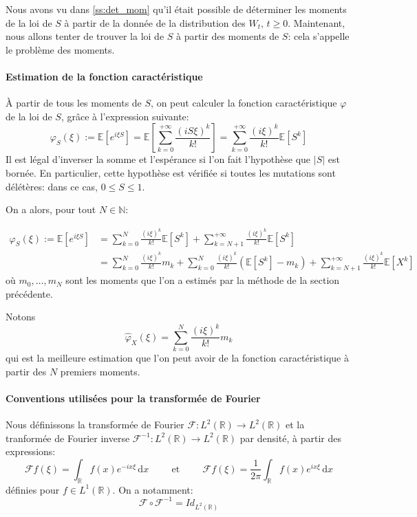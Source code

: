 \documentclass[12pt]{article}
\newcommand{\pth}[1]{\left(#1\right)}
\newcommand{\cro}[1]{\left[#1\right]}
\newcommand{\abs}[1]{\left|#1\right|}
\newcommand{\et}{\hspace{1cm}\text{et}\hspace{1cm}}
\newcommand{\vg}{,\,}
\newcommand{\Er}{\mathbb{R}}
\newcommand{\En}{\mathbb{N}}
\newcommand{\Esp}[1]{\mathbb{E}\cro{#1}}
\newcommand{\de}{\,\mathrm{d}}
\newcommand{\fr}{\mathcal{F}}
\begin{document}
Nous avons vu dans \ref{ss:det_mom} qu'il était possible de déterminer les moments de la loi de $S$ à partir de la donnée de la distribution des $W_t\vg t\geqslant 0$. Maintenant, nous allons tenter de trouver la loi de $S$ à partir des moments de $S$: cela s'appelle le problème des moments.

\paragraph{Estimation de la fonction caractéristique}

À partir de tous les moments de $S$, on peut calculer la fonction caractéristique $\varphi$ de la loi de $S$, grâce à l'expression suivante:
\[\varphi_S(\xi):=\Esp{e^{i\xi S}}=\Esp{\sum_{k=0}^{+\infty}\frac{(iS\xi)^k}{k!}}=\sum_{k=0}^{+\infty}\frac{(i\xi)^k}{k!}\Esp{S^k}\]
Il est légal d'inverser la somme et l'espérance si l'on fait l'hypothèse que $\abs{S}$ est bornée. En particulier, cette hypothèse est vérifiée si toutes les mutations sont délétères: dans ce cas, $0\leqslant S\leqslant 1$.

On a alors, pour tout $N\in\En$:

\begin{align*}
\varphi_S(\xi):=\Esp{e^{i\xi S}}
&=\sum_{k=0}^{N}\frac{(i\xi)^k}{k!}\Esp{S^k}+\sum_{k=N+1}^{+\infty}\frac{(i\xi)^k}{k!}\Esp{S^k}\\
&= \sum_{k=0}^{N}\frac{(i\xi)^k}{k!}m_k + \sum_{k=0}^{N}\frac{(i\xi)^k}{k!}\pth{\Esp{S^k}-m_k}+\sum_{k=N+1}^{+\infty}\frac{(i\xi)^k}{k!}\Esp{X^k}
\end{align*}
où $m_0,\hdots, m_N$ sont les moments que l'on a estimés par la méthode de la section précédente.

Notons \[\hat{\varphi}_X(\xi)=\sum_{k=0}^{N}\frac{(i\xi)^k}{k!}m_k\] qui est la meilleure estimation que l'on peut avoir de la fonction caractéristique à partir des $N$ premiers moments.

\paragraph{Conventions utilisées pour la transformée de Fourier}

Nous définissons la transformée de Fourier $\fr:L^2(\Er)\to L^2(\Er)$ et la tranformée de Fourier inverse $\fr^{-1}:L^2(\Er)\to L^2(\Er)$ par densité, à partir des expressions:
\[\fr f(\xi)=\int_{\Er}f(x)e^{-ix\xi}\de x\et \fr f(\xi)=\frac{1}{2\pi}\int_{\Er}f(x)e^{ix\xi}\de x\]
définies pour $f\in L^1(\Er)$. On a notamment: \[\fr\circ\fr^{-1}=Id_{L^2(\Er)}\]
\end{document}
